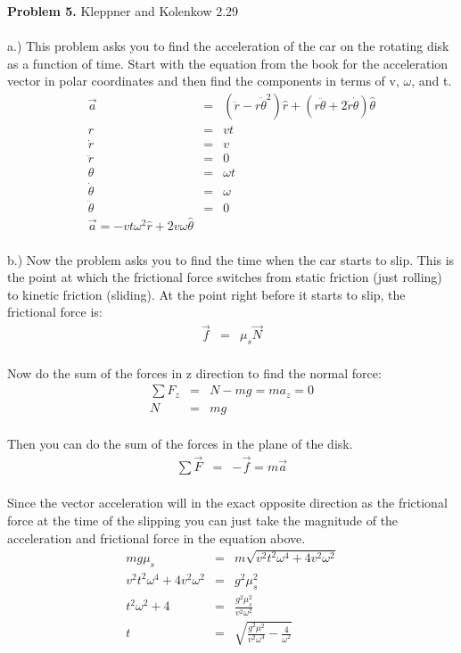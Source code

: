 \documentclass[11pt]{amsart}
\begin{document}
\textbf{Problem 5.} Kleppner and Kolenkow 2.29 \\ \\
a.) This problem asks you to find the acceleration of the car on the rotating disk as a function of time. Start with the equation from the book for the acceleration vector in polar coordinates and then find the components in terms of v, $\omega$, and t. \\
\begin{eqnarray*}
\vec{a} &=& (\ddot{r}-r\dot{\theta}^{2})\hat{r} + (r\ddot{\theta}+2\dot{r}\dot{\theta})\hat{\theta} \\
r &=& vt \\
\dot{r} &=& v \\
\ddot{r} &=& 0 \\
\theta &=& \omega{t} \\
\dot{\theta} &=& \omega \\
\ddot{\theta} &=& 0 \\
\vec{a} = -vt\omega^{2}\hat{r}+2v\omega\hat{\theta} 
\end{eqnarray*} \\
b.) Now the problem asks you to find the time when the car starts to slip. This is the point at which the frictional force switches from static friction (just rolling) to kinetic friction (sliding). At the point right before it starts to slip, the frictional force is: \\
\begin{eqnarray*}
\vec{f} &=& \mu_{s}\vec{N} 
\end{eqnarray*} \\
Now do the sum of the forces in z direction to find the normal force: \\
\begin{eqnarray*} 
\sum{F_{z}} &=& N-mg = ma_{z} = 0 \\ 
N &=& mg 
\end{eqnarray*} \\
Then you can do the sum of the forces in the plane of the disk. \\
\begin{eqnarray*}
\sum{\vec{F}} &=& -\vec{f}= m\vec{a} 
\end{eqnarray*} \\ 
Since the vector acceleration will in the exact opposite direction as the frictional force at the time of the slipping you can just take the magnitude of the acceleration and frictional force in the equation above. \\
\begin{eqnarray*} 
mg\mu_{s} &=& m\sqrt{v^{2}t^{2}\omega^{4}+4v^{2}\omega^{2}} \\
v^{2}t^{2}\omega^{4}+4v^{2}\omega^{2} &=& g^{2}\mu_{s}^{2} \\
t^{2}\omega^{2}+4 &=& \frac{g^{2}\mu_{s}^{2}}{v^{2}\omega^{2}} \\
t &=&\sqrt{\frac{g^{2}\mu^{2}}{v^{2}\omega^{4}}-\frac{4}{\omega^{2}}} 
\end{eqnarray*} \\
\end{document}
